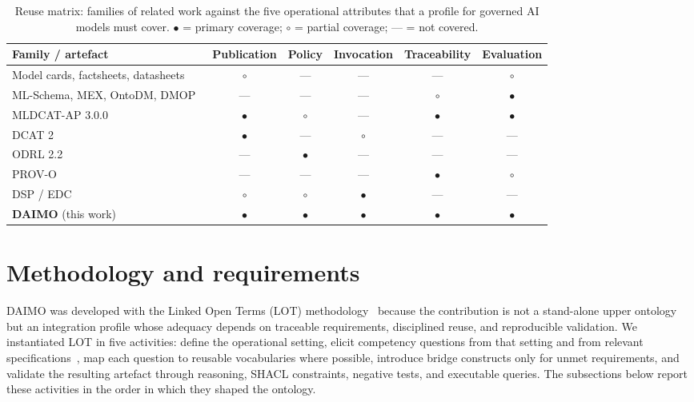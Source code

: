 \documentclass[Afour,sagev,times]{sagej}
\begin{document}
\begin{table}[t]
\small\sf\centering
\caption{Reuse matrix: families of related work against the five operational attributes that a profile for governed AI models must cover. $\bullet$ = primary coverage; $\circ$ = partial coverage; --- = not covered.\label{tab:reuse-matrix}}
\begin{tabular}{@{}lccccc@{}}
\toprule
\textbf{Family / artefact} & \textbf{Publication} & \textbf{Policy} & \textbf{Invocation} & \textbf{Traceability} & \textbf{Evaluation} \\
\midrule
Model cards, factsheets, datasheets~\cite{mitchell19,arnold19,gebru21} & $\circ$ & --- & --- & --- & $\circ$ \\
ML-Schema, MEX, OntoDM, DMOP~\cite{mls,mex,ontodm,dmop} & --- & --- & --- & $\circ$ & $\bullet$ \\
MLDCAT-AP 3.0.0~\cite{mldcatap} & $\bullet$ & $\circ$ & --- & $\bullet$ & $\bullet$ \\
DCAT 2~\cite{dcat2} & $\bullet$ & --- & $\circ$ & --- & --- \\
ODRL 2.2~\cite{odrl22} & --- & $\bullet$ & --- & --- & --- \\
PROV-O~\cite{provo} & --- & --- & --- & $\bullet$ & $\circ$ \\
DSP / EDC~\cite{dsp,edc} & $\circ$ & $\circ$ & $\bullet$ & --- & --- \\
\midrule
\textbf{DAIMO} (this work) & $\bullet$ & $\bullet$ & $\bullet$ & $\bullet$ & $\bullet$ \\
\bottomrule
\end{tabular}
\end{table}

\section{Methodology and requirements}\label{sec:method}

DAIMO was developed with the Linked Open Terms (LOT) methodology~\cite{lot22} because the contribution is not a stand-alone upper ontology but an integration profile whose adequacy depends on traceable requirements, disciplined reuse, and reproducible validation. We instantiated LOT in five activities: define the operational setting, elicit competency questions from that setting and from relevant specifications~\cite{gruninger95}, map each question to reusable vocabularies where possible, introduce bridge constructs only for unmet requirements, and validate the resulting artefact through reasoning, SHACL constraints, negative tests, and executable queries. The subsections below report these activities in the order in which they shaped the ontology.
\end{document}
